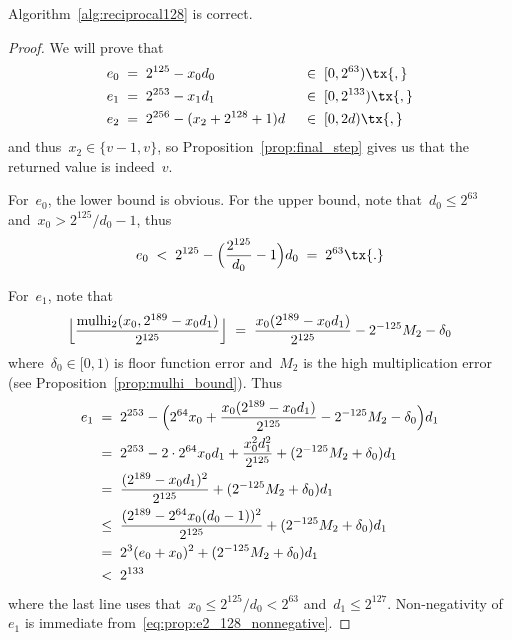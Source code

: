 \documentclass[12pt,oneside,draft]{scrartcl}
\begin{document}
\begin{proposition}
\label{prop:reciprocal128_correct}
Algorithm~\ref{alg:reciprocal128} is correct.
\end{proposition}
\begin{proof}
We will prove that
\begin{alignat}{2}
  e_{0}
\;={}&\;
  2^{125} - x_{0} d_{0}
\;&&{}\in\;
  [0, 2^{63})
\tx{,}
\\
  e_{1}
\;={}&\;
  2^{253} - x_{1} d_{1}
\;&&{}\in\;
  [0, 2^{133})
\tx{,}
\\
  e_{2}
\;={}&\;
  2^{256} - (x_{2} + 2^{128} + 1) d
\;&&{}\in\;
  [0, 2 d)
\tx{,}
\end{alignat}
and thus~$x_{2} \in \{v - 1, v\}$, so Proposition~\ref{prop:final_step} gives us that the returned value is indeed~$v$.

For~$e_{0}$, the lower bound is obvious.  For the upper bound, note that~$d_{0} \le 2^{63}$ and~$x_{0} > 2^{125} / d_{0} - 1$, thus
\begin{gather*}
  e_{0}
\;<\;
  2^{125} - \Bigl( \frac{2^{125}}{d_{0}} - 1 \Bigr) d_{0}
\;=\;
  2^{63}
\tx{.}
\end{gather*}

For~$e_{1}$, note that
\begin{gather}
  \Bigl\lfloor \frac{\operatorname{mulhi}_{2}(x_{0}, 2^{189} - x_{0} d_{1})}{2^{125}} \Bigr\rfloor
\;=\;
  \frac{x_{0} (2^{189} - x_{0} d_{1})}{2^{125}} - 2^{-125} M_{2} - \delta_{0}
\end{gather}
where~$\delta_{0} \in [0, 1)$ is floor function error and~$M_{2}$ is the high multiplication error (see Proposition~\ref{prop:mulhi_bound}).  Thus
\begin{align}
  e_{1}
\;={}&\;
  2^{253} - \Bigl( 2^{64} x_{0} + \frac{x_{0} (2^{189} - x_{0} d_{1})}{2^{125}} - 2^{-125} M_{2} - \delta_{0} \Bigr) d_{1}
  \nonumber
\\
={}&\;
  2^{253} - 2 \cdot 2^{64} x_{0} d_{1} + \frac{x_{0}^{2} d_{1}^{2}}{2^{125}} + (2^{-125} M_{2} + \delta_{0}) d_{1}
  \nonumber
\\
={}&\;
  \frac{(2^{189} - x_{0} d_{1})^{2}}{2^{125}} + (2^{-125} M_{2} + \delta_{0}) d_{1}
\label{eq:prop:e2_128_nonnegative}
\\
\le{}&\;
  \frac{(2^{189} - 2^{64} x_{0} (d_0 - 1))^{2}}{2^{125}} + (2^{-125} M_{2} + \delta_{0}) d_{1}
  \nonumber
\\
={}&\;
  2^{3} (e_{0} + x_{0})^{2} + (2^{-125} M_{2} + \delta_{0}) d_{1}
  \nonumber
\\
<{}&\;
  2^{133}
  \nonumber
\end{align}
where the last line uses that~$x_{0} \le 2^{125} / d_{0} < 2^{63}$ and~$d_{1} \le 2^{127}$.  Non-negativity of~$e_{1}$ is immediate from~\eqref{eq:prop:e2_128_nonnegative}.


\end{proof}
\end{document}
